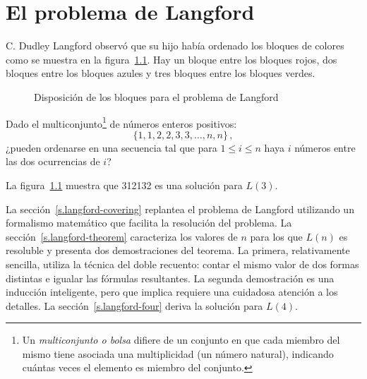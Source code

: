 
\chapter{El problema de Langford}\label{c.langford}


C. Dudley Langford observó que su hijo había ordenado los bloques de colores como se muestra en la figura~\ref{f.langford}.
Hay un bloque entre los bloques rojos, dos bloques entre los bloques azules y tres bloques entre los bloques verdes. 

\begin{figure}[ht]
\begin{center}
\end{center}
\caption{Disposición de los bloques para el problema de Langford}\label{f.langford}
\end{figure}

\begin{definition} Dado el multiconjunto\footnote{Un \emph{multiconjunto o bolsa} difiere de un conjunto en que cada miembro del mismo tiene asociada una multiplicidad (un número natural), indicando cuántas veces el elemento es miembro del conjunto.} de números enteros positivos:
\[
\{1,1,2,2,3,3,\ldots,n,n\}\,,
\]
¿pueden ordenarse en una secuencia tal que para $1\leq i \leq n$ haya $i$ números entre las dos ocurrencias de $i$?
\end{definition}

La figura~\ref{f.langford} muestra que 312132 es una solución para $L(3)$.

La sección~\ref{s.langford-covering} replantea el problema de Langford utilizando un formalismo matemático que facilita la resolución del problema. La sección~\ref{s.langford-theorem} caracteriza los valores de $n$ para los que $L(n)$ es resoluble y presenta dos demostraciones del teorema. La primera, relativamente sencilla, utiliza la técnica del doble recuento: contar el mismo valor de dos formas distintas e igualar las fórmulas resultantes. La segunda demostración es una inducción inteligente, pero que implica requiere una cuidadosa atención a los detalles. La sección~\ref{s.langford-four} deriva la solución para $L(4)$.

